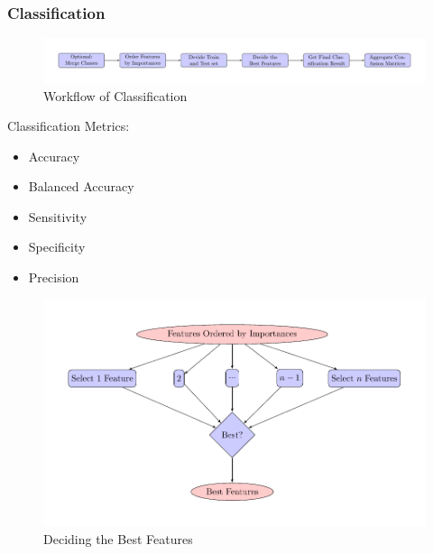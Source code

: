 \documentclass{beamer}
\begin{document}
    \begin{frame}[allowframebreaks]
        \frametitle{Classification}

        \begin{figure}
            \includegraphics[width=0.8 \linewidth]{figures/Classifier/classifier.pdf}
            \caption{Workflow of Classification}
        \end{figure}

        Classification Metrics:
        \begin{itemize}
            \item Accuracy
            \item Balanced Accuracy
            \item Sensitivity
            \item Specificity
            \item Precision
        \end{itemize}

        \begin{figure}
            \includegraphics[width=0.8 \linewidth]{figures/Classifier/best.pdf}
            \caption{Deciding the Best Features}
        \end{figure}
    \end{frame}
\end{document}
